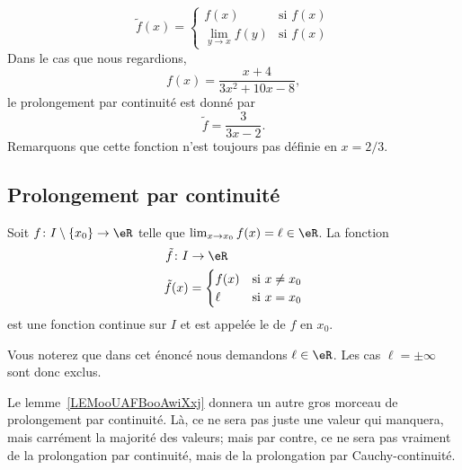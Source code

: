 \begin{equation}
	\tilde f(x)=
	\begin{cases}
		f(x)              & \text{si }f(x) \\
		\lim_{y\to x}f(y) & \text{si }f(x)
	\end{cases}
\end{equation}
Dans le cas que nous regardions,
\[
	f(x)=\frac{ x+4 }{ 3x^2+10x-8 },
\]
le prolongement par continuité est donné par
\begin{equation}
	\tilde f =\frac{ 3 }{ 3x-2 }.
\end{equation}
Remarquons que cette fonction n'est toujours pas définie en $x=2/3$.

\subsection{Prolongement par continuité}

\begin{propositionDef}
	Soit \( f\colon I\setminus\{ x_0 \}\to \eR\) telle que \( \lim_{x\to x_{0}} f(x)=\ell\in \eR\). La fonction
	\begin{equation}
		\begin{aligned}
			\tilde f\colon I & \to \eR                      \\
			\tilde f(x)      & =\begin{cases}
				f(x) & \text{si } x\neq x_0 \\
				\ell & \text{si } x=x_0
			\end{cases}
		\end{aligned}
	\end{equation}
	est une fonction continue sur \( I\) et est appelée le  de \( f\) en \( x_0\).
\end{propositionDef}
Vous noterez que dans cet énoncé nous demandons \( \ell\in \eR\). Les cas \( \ell=\pm\infty\) sont donc exclus.

\begin{normaltext}
	Le lemme~\ref{LEMooUAFBooAwiXxj} donnera un autre gros morceau de prolongement par continuité. Là, ce ne sera pas juste une valeur qui manquera, mais carrément la majorité des valeurs; mais par contre, ce ne sera pas vraiment de la prolongation par continuité, mais de la prolongation par Cauchy-continuité.
\end{normaltext}

